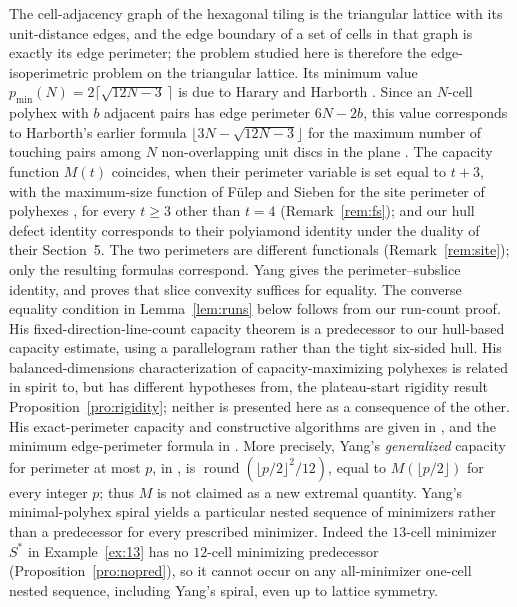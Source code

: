 \documentclass[11pt]{article}
\theoremstyle{plain}
\theoremstyle{definition}
\theoremstyle{remark}
\begin{document}
The cell-adjacency graph of the hexagonal tiling is the triangular lattice
with its unit-distance edges, and the edge boundary of a set of cells in that
graph is exactly its edge perimeter; the problem studied here is therefore the
edge-isoperimetric problem on the triangular lattice. Its minimum value
$p_{\min}(N)=2\lceil\sqrt{12N-3}\,\rceil$ is due to Harary and Harborth
\cite{HararyHarborth1976}.
Since an $N$-cell polyhex with $b$ adjacent pairs has edge perimeter $6N-2b$,
this value corresponds to Harborth's earlier formula
$\lfloor 3N-\sqrt{12N-3}\rfloor$ for the maximum number of touching pairs among
$N$ non-overlapping unit discs in the plane \cite{Harborth1974}. The capacity function $M(t)$
coincides, when their perimeter variable is set equal to $t+3$, with the
maximum-size function of F\"ulep and Sieben for the site perimeter of polyhexes
\cite[Proposition~5.10]{FulepSieben2010}, for every $t\ge 3$ other than $t=4$
(Remark~\ref{rem:fs}); and
our hull defect identity corresponds to their polyiamond identity
\cite[Lemma~3.3]{FulepSieben2010} under the duality of their Section~5. The two perimeters are
different functionals (Remark~\ref{rem:site}); only the resulting formulas correspond.
Yang \cite[Theorem~4]{Yang2002} gives the perimeter--subslice identity,
and \cite[Theorem~5]{Yang2002} proves that slice convexity suffices for equality.
The converse equality condition in Lemma~\ref{lem:runs} below follows from
our run-count proof. His fixed-direction-line-count capacity theorem
\cite[Theorem~7]{Yang2002} is a predecessor to our hull-based capacity
estimate, using a parallelogram rather than the tight six-sided hull.
His balanced-dimensions characterization of capacity-maximizing
polyhexes \cite[Theorem~9]{Yang2002} is related in spirit to, but has
different hypotheses from, the plateau-start rigidity result
Proposition~\ref{pro:rigidity}; neither is presented here as a consequence
of the other. His exact-perimeter capacity and constructive algorithms
are given in \cite[Theorems~8 and 11]{Yang2002}, and the minimum
edge-perimeter formula in \cite[Theorem~18]{Yang2002}.
More precisely, Yang's \emph{generalized} capacity for perimeter at most
\(p\), in \cite[Section~10]{Yang2002}, is
\(\operatorname{round}(\lfloor p/2\rfloor^2/12)\), equal to
\(M(\lfloor p/2\rfloor)\) for every integer \(p\); thus \(M\) is
not claimed as a new extremal quantity. Yang's minimal-polyhex spiral
\cite[Theorems~13--14]{Yang2002} yields a particular nested sequence of
minimizers rather than a predecessor for every prescribed minimizer.
Indeed the \(13\)-cell minimizer \(S^\ast\) in Example~\ref{ex:13}
has no \(12\)-cell minimizing predecessor (Proposition~\ref{pro:nopred}),
so it cannot occur on any all-minimizer one-cell nested sequence,
including Yang's spiral, even up to lattice symmetry.
\end{document}
